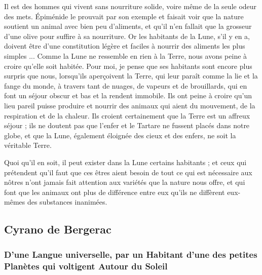 \documentclass[a4paper, 11pt, oneside]{article}
\begin{document}
Il est des hommes qui vivent sans nourriture solide, voire même de la seule odeur des mets. Épiménide le prouvait par son exemple et faisait voir que la nature soutient un animal avec bien peu d'aliments, et qu'il n'en fallait que la grosseur d'une olive pour suffire à sa nourriture. Or les habitants de la Lune, s'il y en a, doivent être d'une constitution légère et faciles à nourrir des aliments les plus simples ... Comme la Lune ne ressemble en rien à la Terre, nous avons peine à croire qu'elle soit habitée. Pour moi, je pense que ses habitants sont encore plus surpris que nous, lorsqu'ils aperçoivent la Terre, qui leur paraît comme la lie et la fange du monde, à travers tant de nuages, de vapeurs et de brouillards, qui en font un séjour obscur et bas et la rendent immobile. Ils ont peine à croire qu'un lieu pareil puisse produire et nourrir des animaux qui aient du mouvement, de la respiration et de la chaleur. Ils croient certainement que la Terre est un affreux séjour ; ils ne doutent pas que l'enfer et le Tartare ne fussent placés dans notre globe, et que la Lune, également éloignée des cieux et des enfers, ne soit la véritable Terre.

Quoi qu'il en soit, il peut exister dans la Lune certains habitants ; et ceux qui prétendent qu'il faut que ces êtres aient besoin de tout ce qui est nécessaire aux nôtres n'ont jamais fait attention aux variétés que la nature nous offre, et qui font que les animaux ont plus de différence entre eux qu'ils ne diffèrent eux-mêmes des substances inanimées.
\clearpage
\subsection{Cyrano de Bergerac}
\subsubsection{D'une Langue universelle, par un Habitant d'une des petites Planètes qui voltigent Autour du Soleil}
\end{document}
